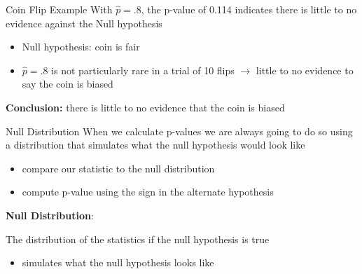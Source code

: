 \documentclass{beamer}
\begin{document}
\begin{frame}{Coin Flip Example}
With $\widehat{p} = .8$, the p-value of 0.114 indicates there is little to no evidence against the Null hypothesis
\begin{itemize}
    \item Null hypothesis: coin is fair
    \item $\widehat{p} = .8$ is not particularly rare in a trial of 10 flips $\rightarrow$ little to no evidence to say the coin is biased
\end{itemize} \vspace{12mm}

\textbf{Conclusion:} there is little to no evidence that the coin is biased
\end{frame}

\begin{frame}{Null Distribution}
When we calculate p-values we are always going to do so using a distribution that simulates what the null hypothesis would look like
\begin{itemize}
    \item compare our statistic to the null distribution
    \item compute p-value using the sign in the alternate hypothesis
\end{itemize} \vspace{8mm}

\textbf{Null Distribution}:

The distribution of the statistics if the null hypothesis is true
\begin{itemize}
    \item simulates what the null hypothesis looks like
\end{itemize} \vspace{8mm}
\end{frame}
\end{document}
